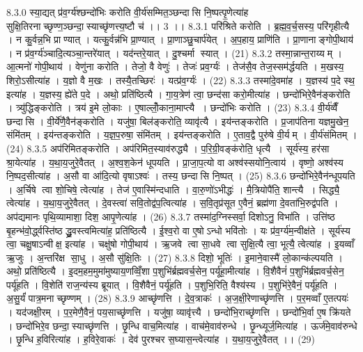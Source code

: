 8.3.0
स्या॒द्यत् प्र॑व॒र्ग्य॑श्छन्दो॑भिः करोति वी॒र्य॑सम्मित॒ञ्छन्दासि नि॒ष्पत्पृ॒णेत्या॑ह सुक्षि॒तिरनाच्छृण्ण॒ञ्छन्दा॒स्याच्छृ॑णत्त्य॒ष्टौ च॑ ।। 3 ।।
8.3.1
परि॑श्रिते करोति । ब्र॒ह्म॒व॒र्च॒सस्य॒ परि॑गृहीत्यै । न कु॒र्वन्न॒भि प्राण्यात् । यत्कु॒र्वन्न॑भि प्रा॒ण्यात् । प्रा॒णाञ्छु॒चार्प॑येत् । अ॒प॒हाय॒ प्राणि॑ति । प्रा॒णानाङ्गोपी॒थाय॑ । न प्र॑व॒र्ग्य॑ञ्चादि॒त्यञ्चा॒न्तरे॑यात् । यद॑न्तरे॒यात् । दु॒श्चर्मा स्यात् । (21)
8.3.2
तस्मा॒न्नान्त॒राय्यम् । आ॒त्मनो॑ गोपी॒थाय॑ । वेणु॑ना करोति । तेजो॒ वै वेणुः॑ । तेजः॑ प्रव॒र्ग्यः॑ । तेज॑सै॒व तेज॒स्सम॑र्द्धयति । म॒खस्य॒ शिरो॒ऽसीत्या॑ह । य॒ज्ञो वै म॒खः । तस्यै॒तच्छिरः॑ । यत्प्र॑व॒र्ग्यः॑ । (22)
8.3.3
तस्मा॑दे॒वमा॑ह । य॒ज्ञस्य॑ प॒दे स्थ॒ इत्या॑ह । य॒ज्ञस्य॒ ह्ये॑ते प॒दे । अथो॒ प्रति॑ष्ठित्यै । गा॒य॒त्रेण॑ त्वा॒ छन्द॑सा करो॒मीत्या॑ह । छन्दो॑भिरे॒वैन॑ङ्करोति । त्र्यु॑द्धिङ्करोति । त्रय॑ इ॒मे लो॒काः । ए॒षाल्लोँ॒काना॒माप्त्यै । छन्दो॑भिः करोति । (23)
8.3.4
वी॒र्य॑व्वैँ छन्दासि । वी॒र्ये॑णै॒वैन॑ङ्करोति । यजु॑षा॒ बिल॑ङ्करोति॒ व्यावृ॑त्यै । इय॑न्तङ्करोति । प्र॒जाप॑तिना यज्ञमु॒खेन॒ संमि॑तम् । इय॑न्तङ्करोति । य॒ज्ञ॒प॒रुषा॒ संमि॑तम् । इय॑न्तङ्करोति । ए॒ताव॒द्वै पुरु॑षे वी॒र्यम् । वी॒र्य॑संमितम् । (24)
8.3.5
अप॑रिमितङ्करोति । अप॑रिमित॒स्याव॑रुद्ध्यै । प॒रि॒ग्री॒वङ्क॑रोति॒ धृत्यै । सूर्य॑स्य॒ हर॑सा श्रा॒येत्या॑ह । य॒था॒य॒जुरे॒वैतत् । अ॒श्व॒श॒केन॑ धूपयति । प्रा॒जा॒प॒त्यो वा अश्व॑स्सयोनि॒त्वाय॑ । वृष्णो॒ अश्व॑स्य नि॒ष्पद॒सीत्या॑ह । अ॒सौ वा आ॑दि॒त्यो वृषाऽश्वः॑ । तस्य॒ छन्दासि नि॒ष्पत् । (25)
8.3.6
छन्दो॑भिरे॒वैन॑न्धूपयति । अ॒र्चिषे त्वा शो॒चिषे॒ त्वेत्या॑ह । तेज॑ ए॒वास्मि॑न्दधाति । वा॒रु॒णो॑ऽभीद्धः॑ । मै॒त्रियोपै॑ति॒ शान्त्यै । सिद्ध्यै॒ त्वेत्या॑ह । य॒था॒य॒जुरे॒वैतत् । दे॒वस्त्वा॑ सवि॒तोद्व॑प॒त्वित्या॑ह । स॒वि॒तृप्र॑सूत ए॒वैनं॒ ब्रह्म॑णा दे॒वता॑भि॒रुद्व॑पति । अप॑द्यमानः पृथि॒व्यामाशा॒ दिश॒ आपृ॒णेत्या॑ह । (26)
8.3.7
तस्मा॑द॒ग्निस्सर्वा॒ दिशोऽनु॒ विभा॑ति । उत्ति॑ष्ठ बृ॒हन्भ॑वो॒र्द्ध्वस्ति॑ष्ठ द्ध्रु॒वस्त्वमित्या॑ह॒ प्रति॑ष्ठित्यै । ई॒श्व॒रो वा ए॒षोऽन्धो भवि॑तोः । यः प्र॑व॒र्ग्य॑म॒न्वीक्ष॑ते । सूर्य॑स्य त्वा॒ चक्षु॒षाऽन्वीक्ष॒ इत्या॑ह । चक्षु॑षो गोपी॒थाय॑ । ऋ॒जवे त्वा सा॒धवे त्वा सुक्षि॒त्यै त्वा॒ भूत्यै॒ त्वेत्या॑ह । इ॒यव्वाँ ऋ॒जुः । अ॒न्तरि॑क्ष सा॒धु । अ॒सौ सु॑क्षि॒तिः । (27)
8.3.8
दिशो॒ भूतिः॑ । इ॒माने॒वास्मै॑ लो॒कान्क॑ल्पयति । अथो॒ प्रति॑ष्ठित्यै । इ॒दम॒हम॒मुमा॑मुष्याय॒णव्विँ॒शा प॒शुभि॑र्ब्रह्मवर्च॒सेन॒ पर्यू॑हा॒मीत्या॑ह । वि॒शैवैनं॑ प॒शुभि॑र्ब्रह्मवर्च॒सेन॒ पर्यू॑हति । वि॒शेति॑ राज॒न्य॑स्य ब्रूयात् । वि॒शैवैनं॒ पर्यू॑हति । प॒शुभि॒रिति॒ वैश्य॑स्य । प॒शुभि॑रे॒वैनं॒ पर्यू॑हति । अ॒सु॒र्यं॑ पात्र॒मनाच्छृण्णम् । (28)
8.3.9
आच्छृ॑णत्ति । दे॒व॒त्राकः॑ । अ॒ज॒क्षी॒रेणाच्छृ॑णत्ति । प॒र॒मव्वाँ ए॒तत्पयः॑ । यद॑जक्षी॒रम् । प॒र॒मेणै॒वैनं॒ पय॒साच्छृ॑णत्ति । यजु॑षा॒ व्यावृ॑त्त्यै । छन्दो॑भि॒राच्छृ॑णत्ति । छन्दो॑भि॒र्वा ए॒ष क्रि॑यते । छन्दो॑भिरे॒व छन्दा॒स्याच्छृ॑णत्ति । छृ॒न्धि वाच॒मित्या॑ह । वाच॑मे॒वाव॑रुन्धे । छृ॒न्ध्यूर्ज॒मित्या॑ह । ऊर्ज॑मे॒वाव॑रुन्धे । छृ॒न्धि ह॒विरित्या॑ह । ह॒विरे॒वाकः॑ । देव॑ पुरश्चर स॒घ्यास॒न्त्वेत्या॑ह । य॒था॒य॒जुरे॒वैतत् ।। (29)
\anuvakamend

